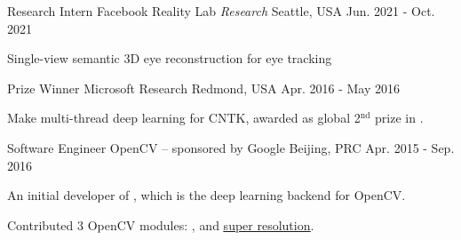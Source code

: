 


\begin{cventries}


\cventry
{Research Intern} %
{Facebook Reality Lab \textit{Research}} %
{Seattle, USA} %
{Jun. 2021 - Oct. 2021} %
{ %
\begin{cvitems}
\item {Single-view semantic 3D eye reconstruction for eye tracking}
\end{cvitems}
}

\cventry
{Prize Winner} %
{Microsoft Research} %
{Redmond, USA} %
{Apr. 2016 - May 2016} %
{ %
\begin{cvitems}
\item {Make multi-thread deep learning for CNTK, awarded as global 2$^\text{nd}$ prize in \href{https://www.microsoft.com/en-us/research/academic-program/microsoft-open-source-challenge/}{}.} %
\end{cvitems}
}

\cventry
{Software Engineer} %
{OpenCV -- sponsored by Google} %
{Beijing, PRC} %
{Apr. 2015 - Sep. 2016} %
{ %
\begin{cvitems}
\item {An initial developer of \href{https://github.com/tiny-dnn/tiny-dnn}{}, which is the deep learning backend for OpenCV}.
\item {Contributed 3 OpenCV modules: \href{https://www.youtube.com/watch?v=Mc20rTYdXTE}{}, \href{https://summerofcode.withgoogle.com/archive/2016/projects/4623962327744512}{} and \href{https://summerofcode.withgoogle.com/archive/2019/projects/6247164785721344}{\color{awesome-skyblue}\underline{super resolution}}.}
\end{cvitems}
}


\end{cventries}
